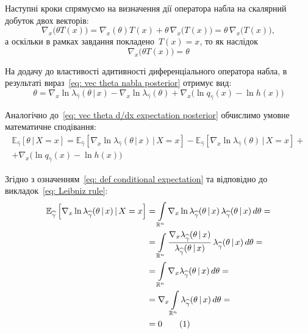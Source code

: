 Наступні кроки спрямуємо на визначення дії оператора набла на скалярний добуток двох векторів:
\begin{equation}
    \nabla_x\bigl( \theta T(x) \bigr) = \nabla_x(\theta) T(x) + \theta\,\nabla_x\bigl( T(x) \bigr) = \theta\,\nabla_x\bigl( T(x) \bigr),
\end{equation}
а оскільки в рамках завдання покладено~$T(x)=x$, то як наслідок
\begin{equation}
    \nabla_x\bigl( \theta T(x) \bigr) = \theta
\end{equation}

На додачу до властивості адитивності диференціального оператора набла, в результаті вираз~\eqref{eq: vec theta nabla posterior} отримує вид:
\begin{equation}
    \theta = \nabla_x\ln{\lambda_{\widehat{\gamma}}(\theta \,|\, x)} - \nabla_x\ln{\lambda_{\widehat{\gamma}}(\theta)} + \nabla_x\bigl( \ln{q_{\widehat{\gamma}}(x)} - \ln{h(x)} \bigr)
\end{equation}

Аналогічно до~\eqref{eq: vec theta d/dx expectation posterior} обчислимо умовне математичне сподівання: 
\begin{multline}\label{eq: theta Bayes estimation}
    \mathbb{E}_{\widehat{\gamma}} \left[ \theta \,|\, X=x \right] = \mathbb{E}_{\widehat{\gamma}} \left[ \nabla_x\ln{\lambda_{\widehat{\gamma}}(\theta \,|\, x)} \,|\, X=x \right] - \mathbb{E}_{\widehat{\gamma}} \left[ \nabla_x\ln{\lambda_{\widehat{\gamma}}(\theta)} \,|\, X=x \right] + \\
    + \nabla_x\bigl( \ln{q_{\widehat{\gamma}}(x)} - \ln{h(x)} \bigr)
\end{multline}

Згідно з означенням~\eqref{eq: def conditional expectation} та відповідно до викладок~\eqref{eq: Leibniz rule}:
\begin{align*}\label{eq: duplicated Leibniz rule}
    \mathbb{E}_{\widehat{\gamma}} \left[ \nabla_x\ln{\lambda_{\widehat{\gamma}}(\theta \,|\, x)} \,|\, X=x \right] & = \int\limits_{\mathbb{R}^n} \nabla_x\ln{\lambda_{\widehat{\gamma}}(\theta \,|\, x)} \, \lambda_{\widehat{\gamma}}(\theta \,|\, x) \, d\theta = \\
    & = \int\limits_{\mathbb{R}^n} \frac{\nabla_x\lambda_{\widehat{\gamma}}(\theta \,|\, x)}{\lambda_{\widehat{\gamma}}(\theta \,|\, x)} \, \lambda_{\widehat{\gamma}}(\theta \,|\, x) \, d\theta = \\
    & = \int\limits_{\mathbb{R}^n} \nabla_x\lambda_{\widehat{\gamma}}(\theta \,|\, x) \, d\theta = \\
    & = \nabla_x \int\limits_{\mathbb{R}^n} \lambda_{\widehat{\gamma}}(\theta \,|\, x) \, d\theta = \\
    & = 0 \stepcounter{equation}\tag{\theequation}
\end{align*}

